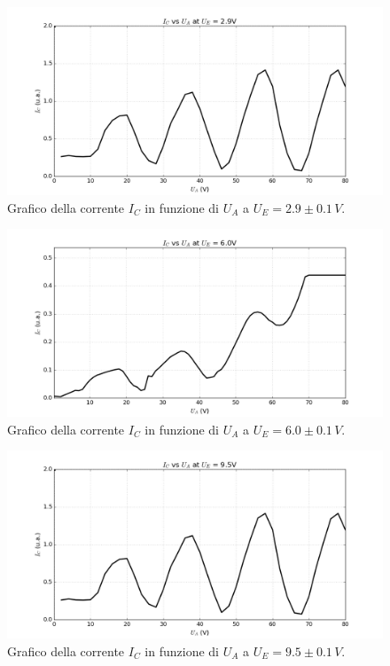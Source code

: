\documentclass[10pt,a4paper]{article}
\begin{document}
\begin{table}[!htb]
\begin{table}[!htb]
\begin{figure}[!htb]
  \centering
  \includegraphics[scale=.5]{plot29.png}
\caption{Grafico della corrente $I_C$ in funzione di $U_A$ a $U_E = 2.9\pm0.1 \, V$.}
\label{grafico4}
\end{figure}

\begin{figure}[!htb]
  \centering
  \includegraphics[scale=.5]{plot60.png}
\caption{Grafico della corrente $I_C$ in funzione di $U_A$ a $U_E = 6.0 \pm 0.1\, V$.}
\label{grafico5}
\end{figure}

\begin{figure}[!htb]
  \centering
  \includegraphics[scale=.5]{plot95.png}
\caption{Grafico della corrente $I_C$ in funzione di $U_A$ a $U_E = 9.5 \pm 0.1\, V$.}
\label{grafico6}
\end{figure}


\end{table}
\end{table}
\end{document}

